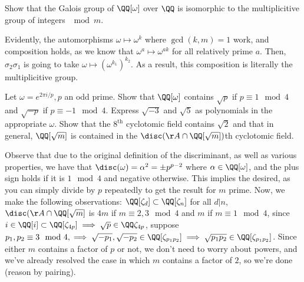 \begin{problem}
Show that the Galois group of \(\QQ[\omega]\) over \(\QQ\) is isomorphic to the multiplicitive group of integers \(\mod m\).
\end{problem}
Evidently, the automorphisms \(\omega \mapsto \omega^k \) where \(\gcd(k,m)=1\) work, and composition holds, as we know that \(\omega^a \mapsto \omega^{ak}\) for all relatively prime \(a\). Then, \(\sigma_2\sigma_1\) is going to take \(\omega \mapsto (\omega^{k_1})^{k_2}\). As a result, this composition is literally the multiplicitive group.

\begin{problem}
Let \(\omega=e^{2\pi i/p}, p \) an odd prime. Show that \(\QQ[\omega]\) contains \(\sqrt{p}\) if \(p \equiv 1 \mod 4\) and \(\sqrt{-p}\) if \(p \equiv -1 \mod 4\). Express \(\sqrt{-3}\) and \(\sqrt{5}\) as polynomials in the appropriate \(\omega\). Show that the \(8^{\text{th}}\) cyclotomic field contains \(\sqrt{2}\) and that in general, \(\QQ[\sqrt{m}]\) is contained in the \(\disc(\AA \cap \QQ[\sqrt{m}])\)th cyclotomic field.
\end{problem}
Observe that due to the original definition of the discriminant, as well as various properties, we have that \(\disc(\omega) = \alpha^2 = \pm p^{p-2}\) where \(\alpha \in \QQ[\omega]\), and the plus sign holds if it is \(1 \mod 4\) and negative otherwise. This implies the desired, as you can simply divide by \(p\) repeatedly to get the result for \(m\) prime. Now, we make the following observations: \(\QQ[\zeta_d] \subset \QQ[\zeta_n]\) for all \(d|n\), \(\disc(\AA \cap \QQ[\sqrt{m}]\) is \(4m\) if \(m \equiv 2, 3 \mod 4\) and \(m\) if \(m \equiv 1 \mod 4\), since \(i \in \QQ[i] \subset \QQ[\zeta_{4p}] \implies \sqrt{p} \in \QQ\zeta_{4p}\), suppose \(p_1, p_2 \equiv 3 \mod 4, \implies \sqrt{-p_1}, \sqrt{-p_2} \in \QQ[\zeta_{p_1p_2}] \implies \sqrt{p_1p_2} \in \QQ[\zeta_{p_1p_2}]\). Since either \(m\) contains a factor of \(p\) or not, we don't need to worry about powers, and we've already resolved the case in which \(m\) contains a factor of \(2\), so we're done (reason by pairing).

